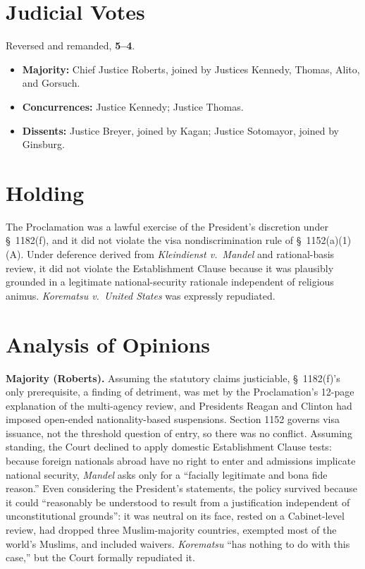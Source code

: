 \documentclass[12pt]{article}
\begin{document}
\section{Judicial Votes}

Reversed and remanded, \textbf{5--4}.
\begin{itemize}
\item \textbf{Majority:} Chief Justice Roberts, joined by Justices Kennedy, Thomas, Alito, and Gorsuch.
\item \textbf{Concurrences:} Justice Kennedy; Justice Thomas.
\item \textbf{Dissents:} Justice Breyer, joined by Kagan; Justice Sotomayor, joined by Ginsburg.
\end{itemize}

\section{Holding}

The Proclamation was a lawful exercise of the President's discretion under \S~1182(f), and it did not violate the visa nondiscrimination rule of \S~1152(a)(1)(A). Under deference derived from \textit{Kleindienst v.\ Mandel} and rational-basis review, it did not violate the Establishment Clause because it was plausibly grounded in a legitimate national-security rationale independent of religious animus. \textit{Korematsu v.\ United States} was expressly repudiated.

\section{Analysis of Opinions}

\textbf{Majority (Roberts).} Assuming the statutory claims justiciable, \S~1182(f)'s only prerequisite, a finding of detriment, was met by the Proclamation's 12-page explanation of the multi-agency review, and Presidents Reagan and Clinton had imposed open-ended nationality-based suspensions. Section 1152 governs visa issuance, not the threshold question of entry, so there was no conflict. Assuming standing, the Court declined to apply domestic Establishment Clause tests: because foreign nationals abroad have no right to enter and admissions implicate national security, \textit{Mandel} asks only for a ``facially legitimate and bona fide reason.'' Even considering the President's statements, the policy survived because it could ``reasonably be understood to result from a justification independent of unconstitutional grounds'': it was neutral on its face, rested on a Cabinet-level review, had dropped three Muslim-majority countries, exempted most of the world's Muslims, and included waivers. \textit{Korematsu} ``has nothing to do with this case,'' but the Court formally repudiated it.
\end{document}
